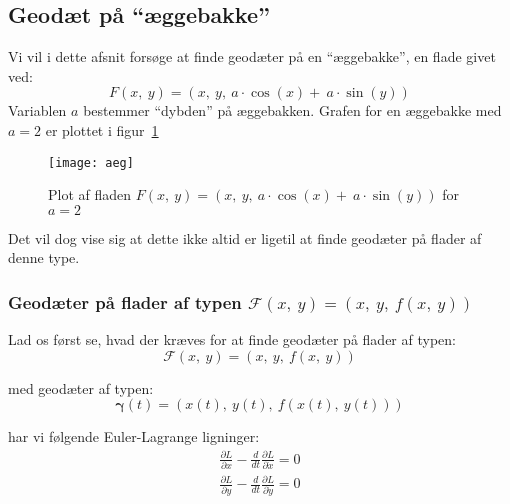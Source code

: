 \newcommand\ddiff[1]{\ddot{#1}}
\newcommand\diff[1]{\dot{#1}}

\subsection{ Geodæt på ``æggebakke'' }
Vi vil i dette afsnit forsøge at finde geodæter på en ``æggebakke'',
en flade givet ved:
\begin{equation}\label{eq:aeggebakke}
F(x,~y) = (x,~y,~a \cdot \cos(x)+~a \cdot \sin(y))
\end{equation}
Variablen \(a\) bestemmer ``dybden'' på æggebakken.
Grafen for en æggebakke med \(a = 2\) er plottet i figur~\ref{fig:aeg}
\begin{figure}[h!]
  \centering
    \texttt{[image: aeg]}
    \caption{Plot af fladen \(F(x,~y) = (x,~y,~a \cdot \cos(x)+~a \cdot \sin(y))\) for \(a=2\)}\label{fig:aeg}
\end{figure}
Det vil dog vise sig at dette ikke altid er ligetil at finde geodæter på flader af denne type.

\subsubsection{Geodæter på flader af typen \(\mathscr{F}(x,~y) = (x,~y,~f(x,~y))\)}
Lad os først se, hvad der kræves for at finde geodæter på flader af typen:
\begin{equation*}
\mathscr{F}(x,~y) = (x,~y,~f(x,~y))
\end{equation*}

med geodæter af typen:
\begin{equation} \label{eq:geodPlanFlade}
\pmb{\gamma}(t) = (x(t),~y(t),~f(x(t),~y(t)))
\end{equation}

har vi følgende Euler-Lagrange ligninger:
\begin{equation*}
\begin{gathered}
\frac{\partial L}{\partial x} - \frac{d}{dt}\frac{\partial L}{\partial \diff{x}} = 0\\
\frac{\partial L}{\partial y} - \frac{d}{dt}\frac{\partial L}{\partial \diff{y}} = 0
\end{gathered}
\end{equation*}

